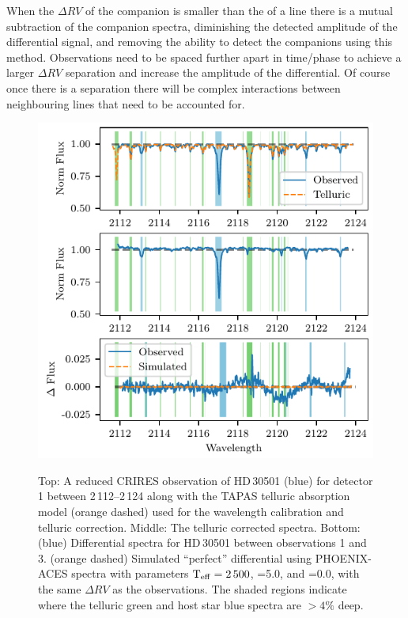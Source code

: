 When the \(\Delta {RV}\) of the companion is smaller than the {\fwhm} of a line there is a mutual subtraction of the companion spectra, diminishing the detected amplitude of the differential signal, and removing the ability to detect the companions using this method.
Observations need to be spaced further apart in time/phase to achieve a larger \(\Delta {RV}\) separation and increase the amplitude of the differential.
Of course once there is a separation there will be complex interactions between neighbouring lines that need to be accounted for.

\begin{figure}
    \centering
    \includegraphics[width=0.8\hsize]{figures/direct-recovery/differential.pdf}\\
    \caption[Example of the spectral differential technique.]{Top: A reduced {CRIRES} observation of {HD\,30501} (blue) for detector 1 between 2\,112--2\,124\nm{} along with the {TAPAS} telluric absorption model ({orange} dashed) used for the wavelength calibration and telluric correction.
        Middle: The telluric corrected spectra.
        Bottom: ({blue}) Differential spectra for {HD\,30501} between observations 1 and 3. ({orange} dashed) Simulated ``perfect'' differential using {PHOENIX-ACES} spectra with parameters \(\textrm{T}_{\mathrm{eff}}{}=2\,500\)\K{}, \logg{}=5.0, and \feh{}=0.0, with the same \(\Delta {RV}\) as the observations.
        The shaded regions indicate where the telluric {green} and host star {blue} spectra are \(> 4\%\) deep.}
    \label{fig:spectral_example}
\end{figure}


